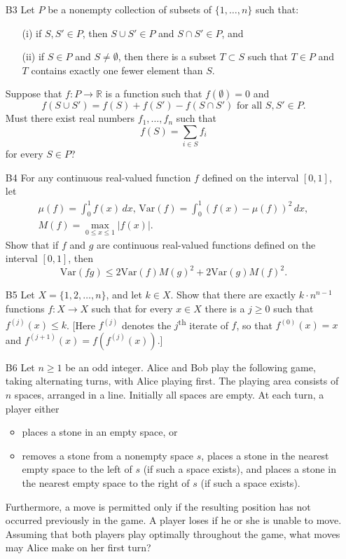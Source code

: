 \documentclass[amssymb,twocolumn,pra,10pt,aps]{revtex4-1}
\begin{document}
\begin{itemize}
\item[B3]
Let $P$ be a nonempty collection of subsets of $\{1,\dots, n\}$ such that:
\begin{enumerate}
\item[(i)]
if $S, S' \in P$, then $S \cup S' \in P$ and $S \cap S' \in P$, and
\item[(ii)]
if $S \in P$ and $S \neq \emptyset$, then there is a subset $T \subset S$
such that $T \in P$ and $T$ contains exactly one fewer element than $S$.
\end{enumerate}
Suppose that $f: P \to \mathbb{R}$ is a function such that
$f(\emptyset) = 0$ and
\[
f(S \cup S') = f(S) + f(S') - f(S \cap S') \mbox{ for all $S,S' \in P$.}
\]
Must there exist real numbers $f_1,\dots,f_n$ such that
\[
f(S) = \sum_{i \in S} f_i
\]
for every $S \in P$?

\item[B4]
For any continuous real-valued function $f$ defined on the interval $[0,1]$, let
\begin{gather*}
\mu(f) = \int_0^1 f(x)\,dx, \,
\mathrm{Var}(f) = \int_0^1 (f(x) - \mu(f))^2\,dx, \\
M(f) = \max_{0 \leq x \leq 1} \left| f(x) \right|.
\end{gather*}
Show that if $f$ and $g$ are continuous real-valued functions
defined on the interval $[0,1]$,
then
\[
\mathrm{Var}(fg) \leq 2 \mathrm{Var}(f) M(g)^2 + 2 \mathrm{Var}(g) M(f)^2.
\]

\item[B5]
Let $X = \{1, 2, \dots, n\}$, and let $k \in X$. Show that there are exactly $k \cdot n^{n-1}$ functions $f: X \to X$ such that for every $x \in X$ there is a $j \geq 0$ such that $f^{(j)}(x) \leq k$.
[Here $f^{(j)}$ denotes the $j$\textsuperscript{th} iterate of $f$, so that $f^{(0)}(x) = x$ and $f^{(j+1)}(x) = f(f^{(j)}(x))$.]

\item[B6]
Let $n \geq 1$ be an odd integer. Alice and Bob play the following game,
taking alternating turns, with Alice playing first. 
The playing area consists of $n$ spaces, arranged in a line.
Initially all spaces are empty.
At each turn, a player either
\begin{itemize}
\item
places a stone in an empty space, or
\item
removes a stone from a nonempty space $s$, 
places a stone in the nearest empty space to the left of $s$
(if such a space exists),
and places a stone in the nearest empty space to the right of $s$
(if such a space exists).
\end{itemize}
Furthermore, a move is permitted only if the resulting position has not occurred previously in the game. A player loses if he or she is unable to move. Assuming that both players play optimally throughout the game, what moves may Alice make on her first turn?

\end{itemize}
\end{document}
